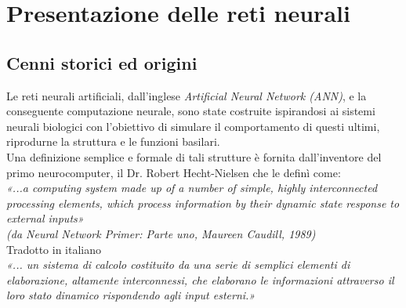 \documentclass[12pt,a4paper,oneside]{book}
\begin{document}


	
\chapter{ Presentazione delle reti neurali }
	
	
	\section{Cenni storici ed origini}
		Le reti neurali artificiali, dall'inglese \textit{Artificial Neural Network (ANN)}, e la conseguente computazione neurale, sono state costruite ispirandosi ai sistemi neurali biologici con l'obiettivo di simulare il comportamento di questi ultimi, riprodurne la struttura e le funzioni basilari.\\
		Una definizione semplice e formale di tali strutture è fornita dall'inventore del primo neurocomputer, il Dr. Robert Hecht-Nielsen che le definì come: \\
		
		\textit{«...a computing system made up of a number of simple, highly interconnected processing elements, which process information by their dynamic state response to external inputs»}\\
		\textit{(da Neural Network Primer: Parte uno, Maureen Caudill, 1989)}\\
		
		Tradotto in italiano \\
		\textit{«... un sistema di calcolo costituito da una serie di semplici elementi di elaborazione, altamente interconnessi, che elaborano le informazioni attraverso il loro stato dinamico rispondendo agli input esterni.»}\\
		
\end{document}

